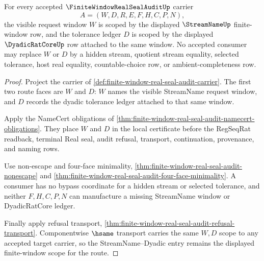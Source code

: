 \begin{theorem}
\label{thm:finite-window-real-seal-audit-streamname-scope}
For every accepted $\FiniteWindowRealSealAuditUp$ carrier
$$
A=(W,D,R,E,F,H,C,P,N),
$$
the visible request window $W$ is scoped by the displayed $\StreamNameUp$ finite-window row, and the tolerance ledger $D$ is scoped by the displayed $\DyadicRatCoreUp$ row attached to the same window. No accepted consumer may replace $W$ or $D$ by a hidden stream, quotient stream equality, selected tolerance, host real equality, countable-choice row, or ambient-completeness row.
\end{theorem}
\begin{proof}
Project the carrier of \autoref{def:finite-window-real-seal-audit-carrier}. The first two route faces are $W$ and $D$: $W$ names the visible StreamName request window, and $D$ records the dyadic tolerance ledger attached to that same window.

Apply the NameCert obligations of \autoref{thm:finite-window-real-seal-audit-namecert-obligations}. They place $W$ and $D$ in the local certificate before the RegSeqRat readback, terminal Real seal, audit refusal, transport, continuation, provenance, and naming rows.

Use non-escape and four-face minimality, \autoref{thm:finite-window-real-seal-audit-nonescape} and \autoref{thm:finite-window-real-seal-audit-four-face-minimality}. A consumer has no bypass coordinate for a hidden stream or selected tolerance, and neither $F,H,C,P,N$ can manufacture a missing StreamName window or DyadicRatCore ledger.

Finally apply refusal transport, \autoref{thm:finite-window-real-seal-audit-refusal-transport}. Componentwise $\hsame$ transport carries the same $W,D$ scope to any accepted target carrier, so the StreamName--Dyadic entry remains the displayed finite-window scope for the route.
\end{proof}

